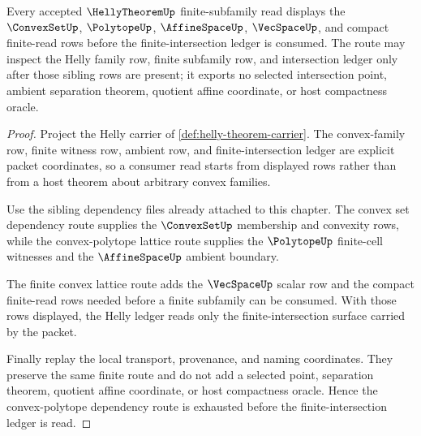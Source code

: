 \begin{theorem}
\label{thm:helly-theorem-convex-polytope-dependency-route}
Every accepted $\HellyTheoremUp$ finite-subfamily read displays the $\ConvexSetUp$, $\PolytopeUp$, $\AffineSpaceUp$, $\VecSpaceUp$, and compact finite-read rows before the finite-intersection ledger is consumed. The route may inspect the Helly family row, finite subfamily row, and intersection ledger only after those sibling rows are present; it exports no selected intersection point, ambient separation theorem, quotient affine coordinate, or host compactness oracle.
\end{theorem}
\begin{proof}
Project the Helly carrier of \autoref{def:helly-theorem-carrier}. The convex-family row, finite witness row, ambient row, and finite-intersection ledger are explicit packet coordinates, so a consumer read starts from displayed rows rather than from a host theorem about arbitrary convex families.

Use the sibling dependency files already attached to this chapter. The convex set dependency route supplies the $\ConvexSetUp$ membership and convexity rows, while the convex-polytope lattice route supplies the $\PolytopeUp$ finite-cell witnesses and the $\AffineSpaceUp$ ambient boundary.

The finite convex lattice route adds the $\VecSpaceUp$ scalar row and the compact finite-read rows needed before a finite subfamily can be consumed. With those rows displayed, the Helly ledger reads only the finite-intersection surface carried by the packet.

Finally replay the local transport, provenance, and naming coordinates. They preserve the same finite route and do not add a selected point, separation theorem, quotient affine coordinate, or host compactness oracle. Hence the convex-polytope dependency route is exhausted before the finite-intersection ledger is read.
\end{proof}
